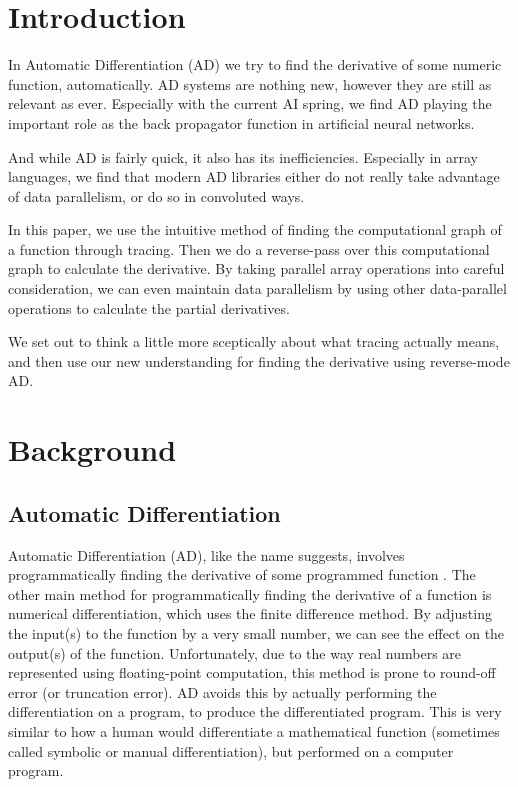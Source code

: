 \section{Introduction}
    In Automatic Differentiation (AD) we try to find the derivative of some numeric function, automatically.
    AD systems are nothing new, however they are still as relevant as ever.
    Especially with the current AI spring, we find AD playing the important role as the back propagator function in artificial neural networks.
    
    And while AD is fairly quick, it also has its inefficiencies.
    Especially in array languages, we find that modern AD libraries either do not really take advantage of data parallelism, or do so in convoluted ways.

    In this paper, we use the intuitive method of finding the computational graph of a function through tracing.
    Then we do a reverse-pass over this computational graph to calculate the derivative.
    By taking parallel array operations into careful consideration, we can even maintain data parallelism by using other data-parallel operations to calculate the partial derivatives.

    We set out to think a little more sceptically about what tracing actually means, and then use our new understanding for finding the derivative using reverse-mode AD.

\section{Background}
    \subsection{Automatic Differentiation} \label{sec:bg_ad}
        Automatic Differentiation (AD), like the name suggests, involves programmatically finding the derivative of some programmed function \cite{margossian2019review}.
        The other main method for programmatically finding the derivative of a function is numerical differentiation, which uses the finite difference method.
        By adjusting the input(s) to the function by a very small number, we can see the effect on the output(s) of the function.
        Unfortunately, due to the way real numbers are represented using floating-point computation, this method is prone to round-off error (or truncation error).
        AD avoids this by actually performing the differentiation on a program, to produce the differentiated program.
        This is very similar to how a human would differentiate a mathematical function (sometimes called symbolic or manual differentiation), but performed on a computer program.
        
